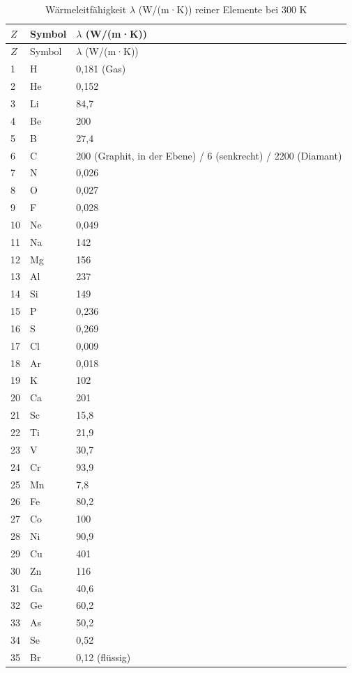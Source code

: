 \documentclass[12pt,a4paper]{article}
\begin{document}
	\begin{longtable}{p{0.6cm}p{1.2cm}p{1.5cm}}
		\caption{Wärmeleitfähigkeit \(\lambda\) (W/(m·K)) reiner Elemente bei 300 K} \label{tab:thermal-conductivity-all} \\
		\toprule
		\(Z\) & Symbol & \(\lambda\) (W/(m·K)) \\
		\midrule
		\endfirsthead
		\toprule
		\(Z\) & Symbol & \(\lambda\) (W/(m·K)) \\
		\midrule
		\endhead
		1  & H  & 0,181 (Gas) \\
		2  & He & 0,152 \\
		3  & Li & 84,7 \\
		4  & Be & 200 \\
		5  & B  & 27,4 \\
		6  & C  & 200 (Graphit, in der Ebene) / 6 (senkrecht) / 2200 (Diamant) \\
		7  & N  & 0,026 \\
		8  & O  & 0,027 \\
		9  & F  & 0,028 \\
		10 & Ne & 0,049 \\
		11 & Na & 142 \\
		12 & Mg & 156 \\
		13 & Al & 237 \\
		14 & Si & 149 \\
		15 & P  & 0,236 \\
		16 & S  & 0,269 \\
		17 & Cl & 0,009 \\
		18 & Ar & 0,018 \\
		19 & K  & 102 \\
		20 & Ca & 201 \\
		21 & Sc & 15,8 \\
		22 & Ti & 21,9 \\
		23 & V  & 30,7 \\
		24 & Cr & 93,9 \\
		25 & Mn & 7,8 \\
		26 & Fe & 80,2 \\
		27 & Co & 100 \\
		28 & Ni & 90,9 \\
		29 & Cu & 401 \\
		30 & Zn & 116 \\
		31 & Ga & 40,6 \\
		32 & Ge & 60,2 \\
		33 & As & 50,2 \\
		34 & Se & 0,52 \\
		35 & Br & 0,12 (flüssig) \\

\end{longtable}
\end{document}
